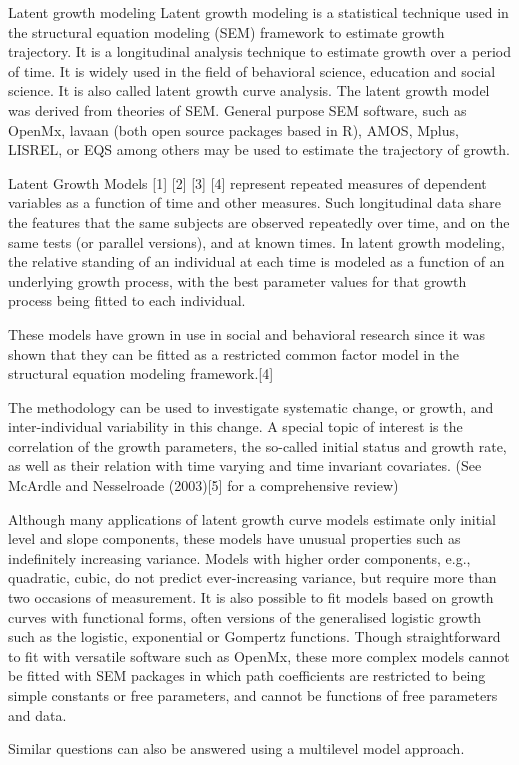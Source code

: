 Latent growth modeling
Latent growth modeling is a statistical technique used in the structural equation modeling (SEM) framework to estimate growth trajectory. It is a longitudinal analysis technique to estimate growth over a period of time. It is widely used in the field of behavioral science, education and social science. It is also called latent growth curve analysis. The latent growth model was derived from theories of SEM. General purpose SEM software, such as OpenMx, lavaan (both open source packages based in R), AMOS, Mplus, LISREL, or EQS among others may be used to estimate the trajectory of growth.

Latent Growth Models [1] [2] [3] [4] represent repeated measures of dependent variables as a function of time and other measures. Such longitudinal data share the features that the same subjects are observed repeatedly over time, and on the same tests (or parallel versions), and at known times. In latent growth modeling, the relative standing of an individual at each time is modeled as a function of an underlying growth process, with the best parameter values for that growth process being fitted to each individual.

These models have grown in use in social and behavioral research since it was shown that they can be fitted as a restricted common factor model in the structural equation modeling framework.[4]

The methodology can be used to investigate systematic change, or growth, and inter-individual variability in this change. A special topic of interest is the correlation of the growth parameters, the so-called initial status and growth rate, as well as their relation with time varying and time invariant covariates. (See McArdle and Nesselroade (2003)[5] for a comprehensive review)

Although many applications of latent growth curve models estimate only initial level and slope components, these models have unusual properties such as indefinitely increasing variance. Models with higher order components, e.g., quadratic, cubic, do not predict ever-increasing variance, but require more than two occasions of measurement. It is also possible to fit models based on growth curves with functional forms, often versions of the generalised logistic growth such as the logistic, exponential or Gompertz functions. Though straightforward to fit with versatile software such as OpenMx, these more complex models cannot be fitted with SEM packages in which path coefficients are restricted to being simple constants or free parameters, and cannot be functions of free parameters and data.

Similar questions can also be answered using a multilevel model approach.
